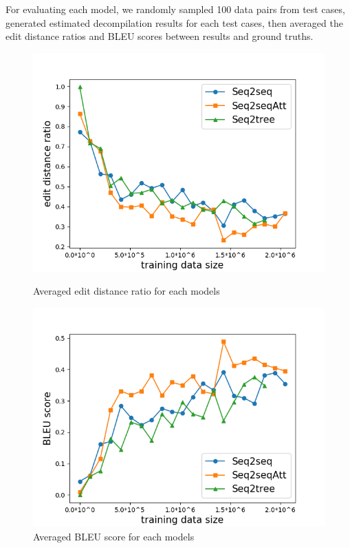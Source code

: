 \documentclass[senior,final,11pt]{iscs-thesis}
\begin{document}






For evaluating each model, we randomly sampled 100 data pairs from test cases, generated estimated decompilation results for each test cases,
then averaged the edit distance ratios and BLEU scores between results and ground truths.

\begin{figure}[]
	\includegraphics[width=12cm]{edit_dist.png}
	\caption{Averaged edit distance ratio for each models}
	\label{fig:editdist}
	\includegraphics[width=12cm]{bleu.png}
	\caption{Averaged BLEU score for each models}
	\label{fig:bleu}
\end{figure}
\end{document}
